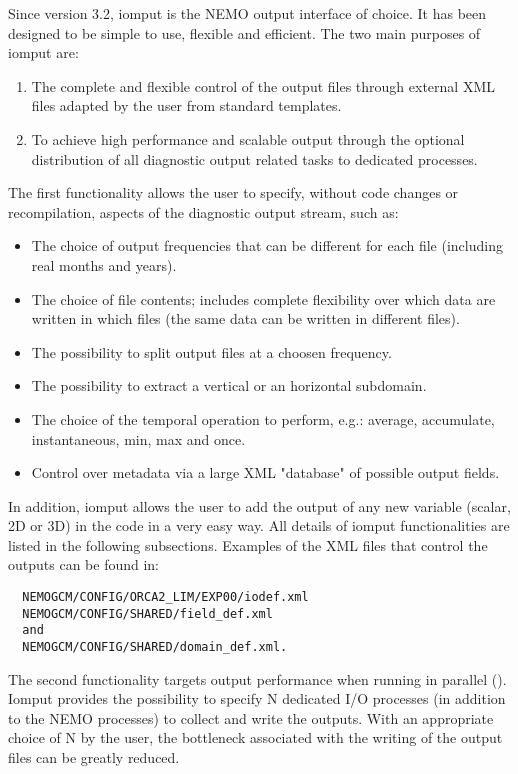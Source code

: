 \documentclass[NEMO_book]{subfiles}
\begin{document}
Since version 3.2, iomput is the NEMO output interface of choice. 
It has been designed to be simple to use, flexible and efficient. 
The two main purposes of iomput are: 
\begin{enumerate}
\item The complete and flexible control of the output files through external XML files adapted by the user from standard templates. 
\item To achieve high performance and scalable output through the optional distribution of all diagnostic output related tasks to dedicated processes. 
\end{enumerate}
The first functionality allows the user to specify, without code changes or recompilation, aspects of the diagnostic output stream, such as:
\begin{itemize}
\item The choice of output frequencies that can be different for each file (including real months and years).
\item The choice of file contents; includes complete flexibility over which data are written in which files (the same data can be written in different files). 
\item The possibility to split output files at a choosen frequency.
\item The possibility to extract a vertical or an horizontal subdomain.
\item The choice of the temporal operation to perform, e.g.: average, accumulate, instantaneous, min, max and once.
\item Control over metadata via a large XML "database" of possible output fields.
\end{itemize}
In addition, iomput allows the user to add the output of any new variable (scalar, 2D or 3D) in the code in a very easy way. All details of iomput functionalities are listed in the following subsections. Examples of the XML files that control the outputs can be found in:
\begin{alltt}
\begin{verbatim}
  NEMOGCM/CONFIG/ORCA2_LIM/EXP00/iodef.xml
  NEMOGCM/CONFIG/SHARED/field_def.xml
  and
  NEMOGCM/CONFIG/SHARED/domain_def.xml.
\end{verbatim}
\end{alltt}

The second functionality targets output performance when running in parallel (). Iomput provides the possibility to specify N dedicated I/O processes (in addition to the NEMO processes) to collect and write the outputs. With an appropriate choice of N by the user, the bottleneck associated with the writing of the output files can be greatly reduced. 
\end{document}

